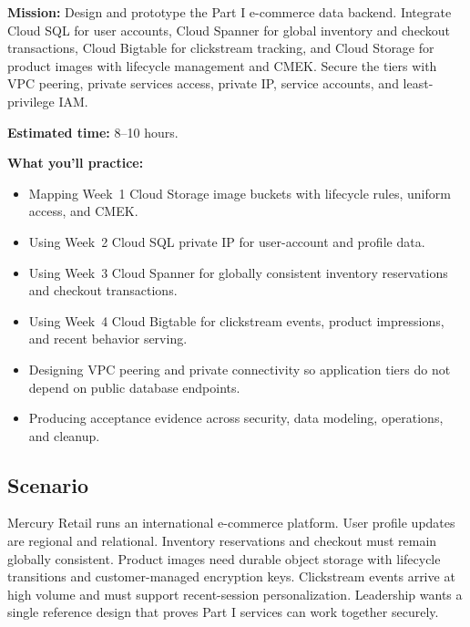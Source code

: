 \begin{capstonebox}
\textbf{Mission:} Design and prototype the Part I e-commerce data backend. Integrate Cloud SQL for user accounts, Cloud Spanner for global inventory and checkout transactions, Cloud Bigtable for clickstream tracking, and Cloud Storage for product images with lifecycle management and CMEK. Secure the tiers with VPC peering, private services access, private IP, service accounts, and least-privilege IAM.

\textbf{Estimated time:} 8--10 hours.

\textbf{What you'll practice:}
\begin{itemize}
    \item Mapping Week~1 Cloud Storage image buckets with lifecycle rules, uniform access, and CMEK.
    \item Using Week~2 Cloud SQL private IP for user-account and profile data.
    \item Using Week~3 Cloud Spanner for globally consistent inventory reservations and checkout transactions.
    \item Using Week~4 Cloud Bigtable for clickstream events, product impressions, and recent behavior serving.
    \item Designing VPC peering and private connectivity so application tiers do not depend on public database endpoints.
    \item Producing acceptance evidence across security, data modeling, operations, and cleanup.
\end{itemize}
\end{capstonebox}

\subsection*{Scenario}
Mercury Retail runs an international e-commerce platform. User profile updates are regional and relational. Inventory reservations and checkout must remain globally consistent. Product images need durable object storage with lifecycle transitions and customer-managed encryption keys. Clickstream events arrive at high volume and must support recent-session personalization. Leadership wants a single reference design that proves Part I services can work together securely.

